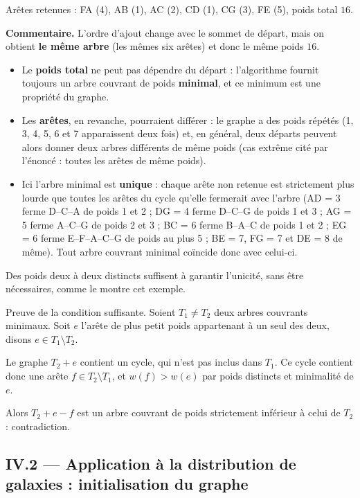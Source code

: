 \documentclass[11pt,a4paper]{article}
\providecommand{\tightlist}{\setlength{\itemsep}{0pt}\setlength{\parskip}{0pt}}
\newcommand{\equationajustee}[1]{%
  \sbox{\boiteequation}{$\displaystyle #1$}%
  \ifdim\wd\boiteequation>\linewidth
    \[\resizebox{\linewidth}{!}{\usebox{\boiteequation}}\]%
  \else
    \[#1\]%
  \fi}
\begin{document}
\equationajustee{\boxed{\text{Ordre d'ajout : F, A, B, C, D, G, E}}}

Arêtes retenues : FA (4), AB (1), AC (2), CD (1), CG (3), FE (5), poids total \(16\).

\textbf{Commentaire.} L'ordre d'ajout change avec le sommet de départ, mais on obtient \textbf{le même arbre} (les mêmes six arêtes) et donc le même poids \(16\).

\begin{itemize}
\tightlist
\item
  Le \textbf{poids total} ne peut pas dépendre du départ : l'algorithme fournit toujours un arbre couvrant de poids \textbf{minimal}, et ce minimum est une propriété du graphe.
\item
  Les \textbf{arêtes}, en revanche, pourraient différer : le graphe a des poids répétés (1, 3, 4, 5, 6 et 7 apparaissent deux fois) et, en général, deux départs peuvent alors donner deux arbres différents de même poids (cas extrême cité par l'énoncé : toutes les arêtes de même poids).
\item
  Ici l'arbre minimal est \textbf{unique} : chaque arête non retenue est strictement plus lourde que toutes les arêtes du cycle qu'elle fermerait avec l'arbre (AD = 3 ferme D--C--A de poids 1 et 2 ; DG = 4 ferme D--C--G de poids 1 et 3 ; AG = 5 ferme A--C--G de poids 2 et 3 ; BC = 6 ferme B--A--C de poids 1 et 2 ; EG = 6 ferme E--F--A--C--G de poids au plus 5 ; BE = 7, FG = 7 et DE = 8 de même). Tout arbre couvrant minimal coïncide donc avec celui-ci.
\end{itemize}

Des poids deux à deux distincts suffisent à garantir l'unicité, sans être nécessaires, comme le montre cet exemple.

Preuve de la condition suffisante. Soient \(T_1 \neq T_2\) deux arbres couvrants minimaux. Soit \(e\) l'arête de plus petit poids appartenant à un seul des deux, disons \(e \in T_1 \setminus T_2\).

Le graphe \(T_2 + e\) contient un cycle, qui n'est pas inclus dans \(T_1\). Ce cycle contient donc une arête \(f \in T_2 \setminus T_1\), et \(w(f) > w(e)\) par poids distincts et minimalité de \(e\).

Alors \(T_2 + e - f\) est un arbre couvrant de poids strictement inférieur à celui de \(T_2\) : contradiction.

\hypertarget{iv.2-application-uxe0-la-distribution-de-galaxies-initialisation-du-graphe}{%
\subsection{IV.2 --- Application à la distribution de galaxies : initialisation du graphe}\label{iv.2-application-uxe0-la-distribution-de-galaxies-initialisation-du-graphe}}
\end{document}
